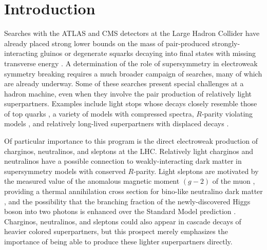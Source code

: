 
\section{Introduction \label{sec:intro}}

Searches with the ATLAS and CMS detectors at the Large Hadron Collider have already placed strong lower bounds on the mass of pair-produced strongly-interacting gluinos or degenerate squarks decaying into final states with missing transverse energy \cite{Aad:2012naa,Chatrchyan:2012uea,Chatrchyan:2013fk,Aad:2013wta,CMS-PAS-SUS-13-004}. 
A  determination of the role of supersymmetry in electroweak symmetry breaking requires a much broader campaign of searches, many of which are already underway. %
Some of these searches present special challenges at a hadron machine, even when they involve the pair production of relatively light superpartners. Examples include light stops whose decays closely resemble those of top quarks \cite{Carena:2008mj,Bi:2011ha,
Bai:2012gs,Alves:2012ft,Han:2012fw,Bhattacherjee:2012mz,Carena:2013iba,
Delgado:2012eu,Dutta:2012kx,Evans:2012bf,Kilic:2012kw,Buckley:2013lpa,Bai:2013ema}, a variety of models with compressed spectra, $R$-parity violating models \cite{Barbier:2004ez,Csaki:2011ge,Berger:2013sir,Evans:2012bf,CMS:yut,CMS:swa}, and relatively long-lived superpartners with displaced decays \cite{Aad:2013txa,Chatrchyan:2012jwg}. %

Of particular importance to this program is the direct electroweak production of charginos, neutralinos, and sleptons at the LHC. Relatively light charginos and neutralinos have a possible connection to weakly-interacting dark matter in supersymmetry models with conserved $R$-parity. Light sleptons are motivated by the measured value of the anomalous magnetic moment $(g-2)$ of the muon \cite{Jegerlehner:2009ry,Miller:2007kk}, providing a thermal annihilation cross section for bino-like neutralino dark matter \cite{Buckley:2013sca}, and the possibility that the branching fraction of the newly-discovered Higgs boson into two photons is enhanced over the Standard Model prediction \cite{Carena:2012gp}. 
Charginos, neutralinos, and sleptons could also appear in cascade decays of heavier colored superpartners, but this prospect merely emphasizes the importance of being able to produce these lighter superpartners directly.

